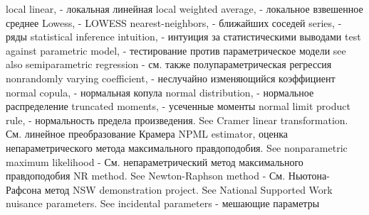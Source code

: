 local linear, - локальная линейная
local weighted average, - локальное взвешенное среднее
Lowess, - LOWESS
nearest-neighbors, - ближайших соседей
series, - ряды
statistical inference intuition, - интуиция за статистическими выводами
test against parametric model, - тестирование против параметрическое модели
see also semiparametric regression - см. также полупараметрическая регрессия
nonrandomly varying coefficient, - неслучайно изменяющийся коэффициент
normal copula, - нормальная копула
normal distribution, - нормальное распределение
truncated moments, - усеченные моменты
normal limit product rule, - нормальность предела произведения. See Cramer linear transformation. См. линейное преобразование Крамера
NPML estimator, оценка непараметрического метода максимального правдоподобия. See nonparametric maximum likelihood - См. непараметрический метод максимального правдоподобия
NR method. See Newton-Raphson method - См. Ньютона-Рафсона метод
NSW demonstration project. See National Supported Work nuisance parameters. See incidental parameters - мешающие параметры

